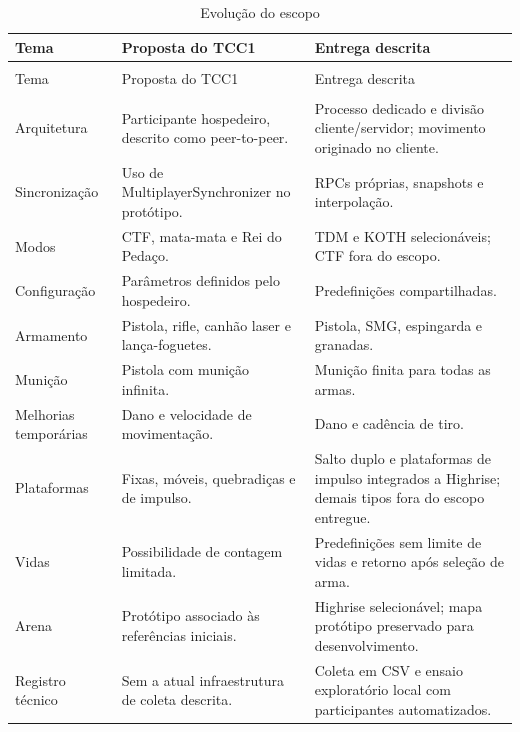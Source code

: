 \begingroup
\small
\setlength{\tabcolsep}{4pt}
\renewcommand{\arraystretch}{1.18}
\begin{longtable}{>{\raggedright\arraybackslash}p{}>{\raggedright\arraybackslash}p{}>{\raggedright\arraybackslash}p{}}
\caption{Evolução do escopo}\label{tab:tcc2-6}\\
\toprule
Tema & Proposta do TCC1 & Entrega descrita \\
\midrule
\endfirsthead
\multicolumn{3}{l}{\small Evolução do escopo (continuação)}\\
\toprule
Tema & Proposta do TCC1 & Entrega descrita \\
\midrule
\endhead
\midrule
\multicolumn{3}{r}{\small Continua na próxima página.}\\
\endfoot
\bottomrule
\endlastfoot
Arquitetura & Participante hospedeiro, descrito como peer-to-peer. & Processo dedicado e divisão cliente/servidor; movimento originado no cliente. \\
Sincronização & Uso de MultiplayerSynchronizer no protótipo. & RPCs próprias, snapshots e interpolação. \\
Modos & CTF, mata-mata e Rei do Pedaço. & TDM e KOTH selecionáveis; CTF fora do escopo. \\
Configuração & Parâmetros definidos pelo hospedeiro. & Predefinições compartilhadas. \\
Armamento & Pistola, rifle, canhão laser e lança-foguetes. & Pistola, SMG, espingarda e granadas. \\
Munição & Pistola com munição infinita. & Munição finita para todas as armas. \\
Melhorias temporárias & Dano e velocidade de movimentação. & Dano e cadência de tiro. \\
Plataformas & Fixas, móveis, quebradiças e de impulso. & Salto duplo e plataformas de impulso integrados a Highrise; demais tipos fora do escopo entregue. \\
Vidas & Possibilidade de contagem limitada. & Predefinições sem limite de vidas e retorno após seleção de arma. \\
Arena & Protótipo associado às referências iniciais. & Highrise selecionável; mapa protótipo preservado para desenvolvimento. \\
Registro técnico & Sem a atual infraestrutura de coleta descrita. & Coleta em CSV e ensaio exploratório local com participantes automatizados. \\
\end{longtable}
\endgroup

